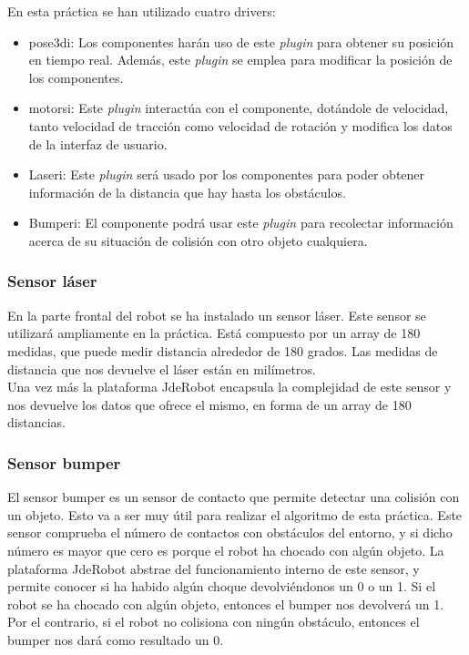 En esta práctica se han utilizado cuatro drivers: 

\begin{itemize}
\item pose3di: Los componentes harán uso de este \textit{plugin} para obtener su posición en tiempo real. Además, este \textit{plugin} se emplea para modificar la posición de los componentes.
\item motorsi: Este \textit{plugin} interactúa con el componente, dotándole de velocidad, tanto velocidad de tracción como velocidad de rotación y modifica los datos de la interfaz de usuario.
\item Laseri: Este \textit{plugin} será usado por los componentes para poder obtener información de la distancia que hay hasta los obstáculos.
\item Bumperi: El componente podrá usar este \textit{plugin} para recolectar información acerca de su situación de colisión con otro objeto cualquiera.
\end{itemize}

\subsubsection{Sensor láser}
En la parte frontal del robot se ha instalado un sensor láser. Este sensor se utilizará ampliamente en la práctica. Está compuesto por un array de 180 medidas, que puede medir distancia alrededor de 180 grados. Las medidas de distancia que nos devuelve el láser están en milímetros.\\

Una vez más la plataforma JdeRobot encapsula la complejidad de este sensor y nos devuelve los datos que ofrece el mismo, en forma de un array de 180 distancias.

\subsubsection{Sensor bumper}
El sensor bumper es un sensor de contacto que permite detectar una colisión con un objeto. Esto va a ser muy útil para realizar el algoritmo de esta práctica. Este sensor comprueba el número de contactos con obstáculos del entorno, y si dicho número es mayor que cero es porque el robot ha chocado con algún objeto. La plataforma JdeRobot abstrae del funcionamiento interno de este sensor, y permite conocer si ha habido algún choque devolviéndonos un 0 o un 1. Si el robot se ha chocado con algún objeto, entonces el bumper nos devolverá un 1. Por el contrario, si el robot no colisiona con ningún obstáculo, entonces el bumper nos dará como resultado un 0.



